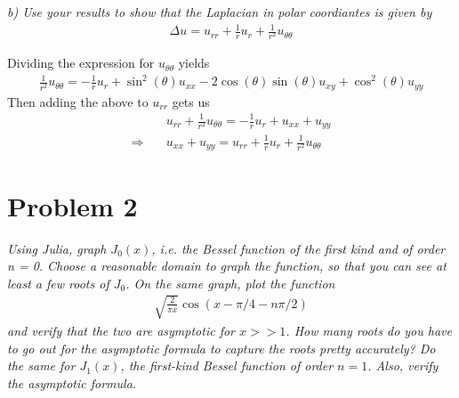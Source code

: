 \documentclass[12pt]{article}
\theoremstyle{remark}
\begin{document}
\newpage

\textit{b) Use your results to show that the Laplacian in polar coordiantes is given by}
\begin{align*}
	\Delta u = u_{rr} + \frac{1}{r}u_r + \frac{1}{r^2}u_{\theta\theta}
\end{align*}

Dividing the expression for $u_{\theta\theta}$ yields
\begin{align*}
	\frac{1}{r^2}u_{\theta\theta} = -\frac{1}{r}u_r + \sin^2(\theta) u_{xx} - 2\cos(\theta)\sin(\theta)u_{xy} + \cos^2(\theta)u_{yy}
\end{align*}
Then adding the above to $u_{rr}$ gets us
\begin{align*}
	& u_{rr} + \frac{1}{r^2}u_{\theta\theta} = -\frac{1}{r}u_r + u_{xx} + u_{yy} \\
	\Rightarrow \quad & u_{xx} + u_{yy} = u_{rr} + \frac{1}{r}u_r + \frac{1}{r^2}u_{\theta\theta}
\end{align*}

\newpage

\section*{Problem 2}

\textit{Using Julia, graph $J_0(x)$, i.e. the Bessel function of the first kind and of order n = 0. Choose a reasonable domain to graph the function, so that you can see at least a few roots of $J_0$. On the same graph, plot the function}
\begin{align}
	\sqrt{\frac{2}{\pi x}}\cos(x - \pi/4 -n\pi/2)
\end{align} 
\textit{and verify that the two are asymptotic for $x >> 1$. How many roots do you have to go out for the asymptotic formula to capture the roots pretty accurately? Do the same for $J_1(x)$, the first-kind Bessel function of order $n = 1$. Also, verify the asymptotic formula.}
\end{document}
